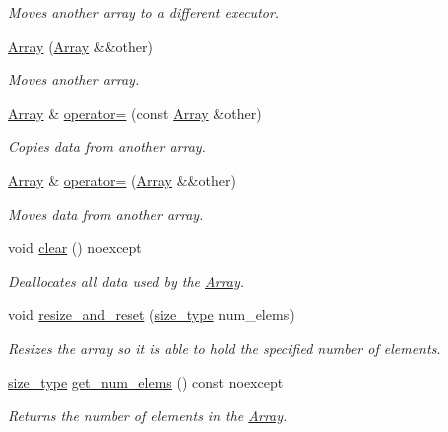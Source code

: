 \begin{DoxyCompactItemize}
\begin{DoxyCompactList}\small\item\em Moves another array to a different executor. \end{DoxyCompactList}\item 
\hyperlink{classgko_1_1Array_a29da5ccbf776b7c85dbda0e8b4f20647}{Array} (\hyperlink{classgko_1_1Array}{Array} \&\&other)
\begin{DoxyCompactList}\small\item\em Moves another array. \end{DoxyCompactList}\item 
\hyperlink{classgko_1_1Array}{Array} \& \hyperlink{classgko_1_1Array_a841412d7a03b8210ba39e77b3bd05ce3}{operator=} (const \hyperlink{classgko_1_1Array}{Array} \&other)
\begin{DoxyCompactList}\small\item\em Copies data from another array. \end{DoxyCompactList}\item 
\hyperlink{classgko_1_1Array}{Array} \& \hyperlink{classgko_1_1Array_a62d5346849e3943a5fcac962e344ab58}{operator=} (\hyperlink{classgko_1_1Array}{Array} \&\&other)
\begin{DoxyCompactList}\small\item\em Moves data from another array. \end{DoxyCompactList}\item 
void \hyperlink{classgko_1_1Array_a64f7e9f19c4e8cff8adb402da70476c3}{clear} () noexcept
\begin{DoxyCompactList}\small\item\em Deallocates all data used by the \hyperlink{classgko_1_1Array}{Array}. \end{DoxyCompactList}\item 
void \hyperlink{classgko_1_1Array_ab42114c635a05ecff66e1ab5e5074d14}{resize\+\_\+and\+\_\+reset} (\hyperlink{namespacegko_a6e5c95df0ae4e47aab2f604a22d98ee7}{size\+\_\+type} num\+\_\+elems)
\begin{DoxyCompactList}\small\item\em Resizes the array so it is able to hold the specified number of elements. \end{DoxyCompactList}\item 
\hyperlink{namespacegko_a6e5c95df0ae4e47aab2f604a22d98ee7}{size\+\_\+type} \hyperlink{classgko_1_1Array_ad4a2aa179d350634e6579f144b6b2cf0}{get\+\_\+num\+\_\+elems} () const noexcept
\begin{DoxyCompactList}\small\item\em Returns the number of elements in the \hyperlink{classgko_1_1Array}{Array}. \end{DoxyCompactList}\item 

\end{DoxyCompactItemize}
